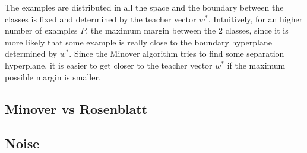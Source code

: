 The examples are distributed in all the space and the boundary between the classes is fixed and determined by the teacher vector $w^{*}$.
Intuitively, for an higher number of examples $P$, the maximum margin between the $2$ classes, since it is more likely that some example is really close to the boundary hyperplane determined by $w^{*}$.
Since the Minover algorithm tries to find some separation hyperplane, it is easier to get closer to the teacher vector $w^{*}$ if the maximum possible margin is smaller.


\subsection{Minover vs Rosenblatt}

\subsection{Noise}
